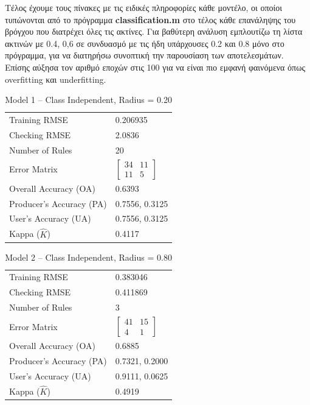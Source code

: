 \documentclass[12pt]{report}
\begin{document}
Τέλος έχουμε τους πίνακες με τις ειδικές πληροφορίες κάθε μοντέλο, οι οποίοι τυπώνονται από το πρόγραμμα \textbf{classification.m} στο τέλος κάθε επανάληψης του βρόγχου που διατρέχει όλες τις ακτίνες. Για βαθύτερη ανάλυση εμπλουτίζω τη λίστα ακτινών με 0.4, 0,6 σε συνδυασμό με τις ήδη υπάρχουσες 0.2 και 0.8 μόνο στο πρόγραμμα, για να διατηρήσω συνοπτική την παρουσίαση των αποτελεσμάτων. Επίσης αύξησα τον αριθμό εποχών στις 100 για να είναι πιο εμφανή φαινόμενα όπως overfitting και underfitting.

\begin{table}[H]
    \centering
    \caption{Model 1 -- Class Independent, Radius = 0.20}
    \begin{tabular}{ll}
    \hline
    Training RMSE & 0.206935 \\
    Checking RMSE & 2.0836 \\
    Number of Rules & 20 \\
    Error Matrix & $\begin{bmatrix} 34 & 11 \\ 11 & 5 \end{bmatrix}$ \\
    Overall Accuracy (OA) & 0.6393 \\
    Producer's Accuracy (PA) & 0.7556, 0.3125 \\
    User's Accuracy (UA) & 0.7556, 0.3125 \\
    Kappa ($\hat{K}$) & 0.4117 \\
    \hline
    \end{tabular}
\end{table}

\begin{table}[H]
    \centering
    \caption{Model 2 -- Class Independent, Radius = 0.80}
    \begin{tabular}{ll}
    \hline
    Training RMSE & 0.383046 \\
    Checking RMSE & 0.411869 \\
    Number of Rules & 3 \\
    Error Matrix & $\begin{bmatrix} 41 & 15 \\ 4 & 1 \end{bmatrix}$ \\
    Overall Accuracy (OA) & 0.6885 \\
    Producer's Accuracy (PA) & 0.7321, 0.2000 \\
    User's Accuracy (UA) & 0.9111, 0.0625 \\
    Kappa ($\hat{K}$) & 0.4919 \\
    \hline
    \end{tabular}
\end{table}
\end{document}
